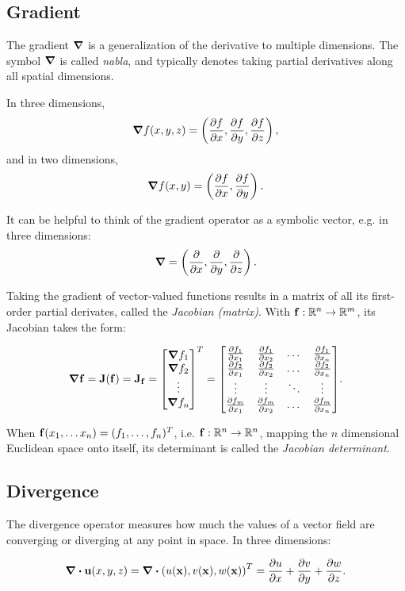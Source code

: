 \subsection*{Gradient}
The gradient $\grad$ is a generalization of the derivative to multiple
dimensions. The symbol $\grad$ is called \textit{nabla}, and typically denotes
taking partial derivatives along all spatial dimensions. 

In three dimensions, 
$$\grad f(x,y,z) = \left(\pdv{f}{x}, \pdv{f}{y}, \pdv{f}{z}\right),$$ 
and in two dimensions,
$$\grad f(x,y) = \left(\pdv{f}{x}, \pdv{f}{y}\right).$$

It can be helpful to think of the gradient operator as a symbolic
vector, e.g. in three dimensions:
$$\grad = \left(\pdv{x}, \pdv{y}, \pdv{z}\right).$$ 

Taking the gradient of vector-valued functions results in a matrix of all its
first-order partial derivates, called the \textit{Jacobian (matrix)}. With
$\vb{f}: \mathbb{R}^n \to \mathbb{R}^m$, its Jacobian takes the form:

\begin{equation}\label{eq:jacobian-matrix}
\grad \vb{f} = \vb{J}(\vb{f}) = \vb{J}_{\vb{f}}=
\mqty[\grad{f_1}\\\grad{f_2}\\\vdots\\\grad f_n]^T = 
\mqty[
\pdv{f_1}{x_1} & \pdv{f_1}{x_2} & \dots & \pdv{f_1}{x_n}\\
\pdv{f_2}{x_1} & \pdv{f_2}{x_2} & \dots & \pdv{f_2}{x_n}\\
\vdots         &    \vdots      & \ddots & \vdots \\
\pdv{f_m}{x_1} & \pdv{f_m}{x_2} & \dots & \pdv{f_m}{x_n}
].
\end{equation}

When $\vb{f}(x_1,\dots x_n) = (f_1, \dots, f_n)^T$, i.e. $\vb{f}: \mathbb{R}^n
\to \mathbb{R}^n$, mapping the $n$ dimensional Euclidean space onto itself,
its determinant is called the \textit{Jacobian determinant}.

\subsection*{Divergence}
The divergence operator measures how much the values of a vector field are
converging or diverging at any point in space. In three dimensions:

$$\div{\vb{u}(x,y,z)} = \div(u(\vb{x}), v(\vb{x}), w(\vb{x}))^T = 
\pdv{u}{x}+\pdv{v}{y}+\pdv{w}{z}.$$

